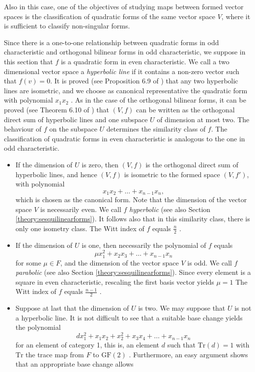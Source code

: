 \documentclass[a4paper,11pt]{report}
\begin{document}
{{ Also in this case, one of the objectives of studying maps between formed
vector spaces is the classification of quadratic forms of the same vector
space $V$, where it is sufficient to classify non-singular forms. 

Since there is a one-to-one relationship between quadratic forms in odd
characteristic and orthogonal bilinear forms in odd characteristic, we suppose
in this section that $f$ is a quadratic form in even characteristic. We call a two dimensional vector
space a \emph{hyperbolic line} if it contains a non-zero vector such that $f(v) = 0$. It is proved (see Proposition 6.9 of \cite{Cameron}) that any two hyperbolic lines are isometric, and we choose as canonical
representative the quadratic form with polynomial $x_1 x_2$ . As in the case of the orthogonal bilinear forms, it can be proved (see
Theorem 6.10 of \cite{Cameron}) that $(V,f)$ can be written as the orthogonal direct sum of hyperbolic lines and one
subspace $U$ of dimension at most two. The behaviour of $f$ on the subspace $U$ determines the similarity class of $f$. The classification of quadratic forms in even characteristic is analogous to
the one in odd characteristic. 
\begin{itemize}
\item If the dimension of $U$ is zero, then $(V,f)$ is the orthogonal direct sum of hyperbolic lines, and hence $(V,f)$ is isometric to the formed space $(V,f')$, with polynomial 
\[x_1 x_2 + \ldots + x_{n-1}x_n,\]
  which is chosen as the canonical form. Note that the dimension of the vector
space $V$ is necessarily even. We call $f$ \emph{hyperbolic} (see also Section \ref{theory:sesquilinearforms}). It follows also that in this similarity class, there is only one isometry
class. The Witt index of $f$ equals $\frac{n}{2}$ . 
\item If the dimension of $U$ is one, then necessarily the polynomial of $f$ equals 
\[ \mu x_1^2 + x_2 x_3 + \ldots + x_{n-1}x_n \]
  for some $\mu \in F$, and the dimension of the vector space $V$ is odd. We call $f$ \emph{parabolic} (see also Section \ref{theory:sesquilinearforms}). Since every element is a square in even characteristic, rescaling the first
basis vector yields $\mu=1$ The Witt index of $f$ equals $\frac{n-1}{2}$ . 
\item  Suppose at last that the dimension of $U$ is two. We may suppose that $U$ is not a hyperbolic line. It is not difficult to see that a suitable base
change yields the polynomial 
\[ d x_1^2 + x_1x_2 + x_2^2 + x_3 x_4 + \ldots + x_{n-1}x_n \]
 for an element of category 1, this is, an element $d$ such that  $\mathrm{Tr}(d)=1$  with $\mathrm{Tr}$  the trace map from $F$ to $\mathrm{GF}(2)$ . Furthermore, an easy argument shows that an appropriate base change allows

\end{itemize}}}
\end{document}
